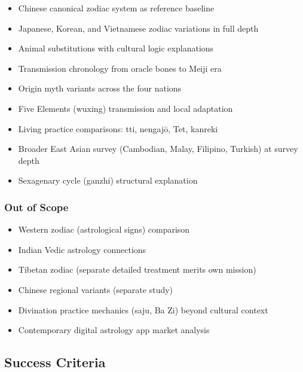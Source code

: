 \documentclass[11pt,letterpaper]{article}
\begin{document}
\begin{itemize}[leftmargin=2em]
  \item Chinese canonical zodiac system as reference baseline
  \item Japanese, Korean, and Vietnamese zodiac variations in full depth
  \item Animal substitutions with cultural logic explanations
  \item Transmission chronology from oracle bones to Meiji era
  \item Origin myth variants across the four nations
  \item Five Elements (wuxing) transmission and local adaptation
  \item Living practice comparisons: tti, nengaj\={o}, Tet, kanreki
  \item Broader East Asian survey (Cambodian, Malay, Filipino, Turkish) at survey depth
  \item Sexagenary cycle (ganzhi) structural explanation
\end{itemize}

\subsubsection{Out of Scope}

\begin{itemize}[leftmargin=2em]
  \item Western zodiac (astrological signs) comparison
  \item Indian Vedic astrology connections
  \item Tibetan zodiac (separate detailed treatment merits own mission)
  \item Chinese regional variants (separate study)
  \item Divination practice mechanics (saju, Ba Zi) beyond cultural context
  \item Contemporary digital astrology app market analysis
\end{itemize}

\subsection{Success Criteria}
\end{document}
